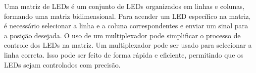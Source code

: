 Uma matriz de LEDs é um conjunto de LEDs organizados em linhas e colunas, formando uma matriz bidimensional. Para acender um LED específico na matriz, é necessário selecionar a linha e a coluna correspondentes e enviar um sinal para a posição desejada. O uso de um multiplexador pode simplificar o processo de controle dos LEDs na matriz. Um multiplexador pode ser usado para selecionar a linha correta. Isso pode ser feito de forma rápida e eficiente, permitindo que os LEDs sejam controlados com precisão.